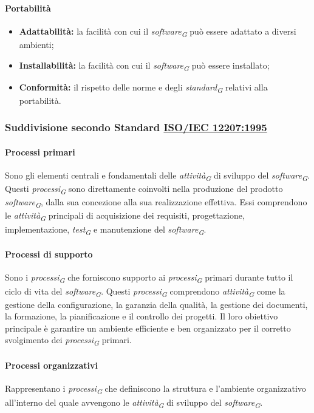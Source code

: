 \paragraph{Portabilità}
\begin{itemize}
    \item \textbf{Adattabilità:} la facilità con cui il \textit{software}\textsubscript{\textit{G}} può essere adattato a diversi ambienti;
    \item \textbf{Installabilità:} la facilità con cui il \textit{software}\textsubscript{\textit{G}} può essere installato;
    \item \textbf{Conformità:} il rispetto delle norme e degli \textit{standard}\textsubscript{\textit{G}} relativi alla portabilità.
\end{itemize}


\subsubsection{Suddivisione secondo Standard \href{https://www.math.unipd.it/~tullio/IS-1/2009/Approfondimenti/ISO_12207-1995.pdf}{ISO/IEC 12207:1995}}

\paragraph{Processi primari}
Sono gli elementi centrali e fondamentali delle \textit{attività}\textsubscript{\textit{G}} di sviluppo del \textit{software}\textsubscript{\textit{G}}. Questi \textit{processi}\textsubscript{\textit{G}} sono direttamente coinvolti nella produzione del prodotto \textit{software}\textsubscript{\textit{G}}, dalla sua concezione alla sua realizzazione effettiva. Essi comprendono le \textit{attività}\textsubscript{\textit{G}} principali di acquisizione dei requisiti, progettazione, implementazione, \textit{test}\textsubscript{\textit{G}} e manutenzione del \textit{software}\textsubscript{\textit{G}}.

\paragraph{Processi di supporto}
Sono i \textit{processi}\textsubscript{\textit{G}} che forniscono supporto ai \textit{processi}\textsubscript{\textit{G}} primari durante tutto il ciclo di vita del \textit{software}\textsubscript{\textit{G}}. Questi \textit{processi}\textsubscript{\textit{G}} comprendono \textit{attività}\textsubscript{\textit{G}} come la gestione della configurazione, la garanzia della qualità, la gestione dei documenti, la formazione, la pianificazione e il controllo dei progetti. Il loro obiettivo principale è garantire un ambiente efficiente e ben organizzato per il corretto svolgimento dei \textit{processi}\textsubscript{\textit{G}} primari.

\paragraph{Processi organizzativi}
Rappresentano i \textit{processi}\textsubscript{\textit{G}} che definiscono la struttura e l'ambiente organizzativo all'interno del quale avvengono le \textit{attività}\textsubscript{\textit{G}} di sviluppo del \textit{software}\textsubscript{\textit{G}}. 
